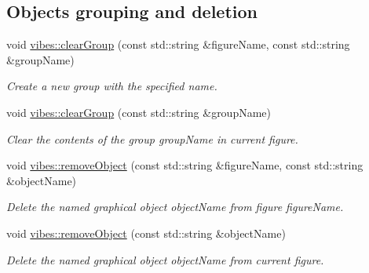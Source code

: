\subsection*{Objects grouping and deletion}
\begin{DoxyCompactItemize}
\item 
void \hyperlink{group__drawing_gaf31a1d5f2b5e2b24638e8d5f98298cc9}{vibes\+::clear\+Group} (const std\+::string \&figure\+Name, const std\+::string \&group\+Name)
\begin{DoxyCompactList}\small\item\em Create a new group with the specified {\itshape name}. \end{DoxyCompactList}\item 
\mbox{\label{group__drawing_ga04b794cb10a281c580ce457a545ddf1e}} 
void \hyperlink{group__drawing_ga04b794cb10a281c580ce457a545ddf1e}{vibes\+::clear\+Group} (const std\+::string \&group\+Name)
\begin{DoxyCompactList}\small\item\em Clear the contents of the group {\itshape group\+Name} in current figure. \end{DoxyCompactList}\item 
\mbox{\label{group__drawing_ga97214bfe53545e8ba3fea1bf27433bf8}} 
void \hyperlink{group__drawing_ga97214bfe53545e8ba3fea1bf27433bf8}{vibes\+::remove\+Object} (const std\+::string \&figure\+Name, const std\+::string \&object\+Name)
\begin{DoxyCompactList}\small\item\em Delete the named graphical object {\itshape object\+Name} from figure {\itshape figure\+Name}. \end{DoxyCompactList}\item 
\mbox{\label{group__drawing_ga0fc887c8bab5eb1c9a3e5e315e9d44d5}} 
void \hyperlink{group__drawing_ga0fc887c8bab5eb1c9a3e5e315e9d44d5}{vibes\+::remove\+Object} (const std\+::string \&object\+Name)
\begin{DoxyCompactList}\small\item\em Delete the named graphical object {\itshape object\+Name} from current figure. \end{DoxyCompactList}\end{DoxyCompactItemize}
